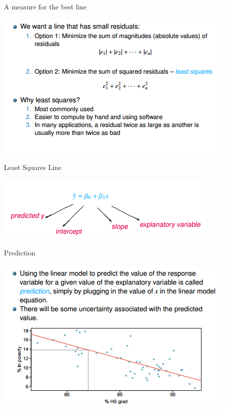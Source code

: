 \documentclass{beamer}
\begin{document}
\begin{frame}{A measure for the best line}
    \begin{center}
        \includegraphics[scale=0.6]{errorMeasures.png}
    \end{center}
\end{frame}
\begin{frame}{Least Squares Line}
    \begin{center}
        \includegraphics[scale=0.6]{leastSquaresLine.png}
    \end{center}
\end{frame}
\begin{frame}{Prediction}
    \begin{center}
        \includegraphics[scale=0.6]{leastSquaresPrediction.png}
    \end{center}
\end{frame}
\end{document}
